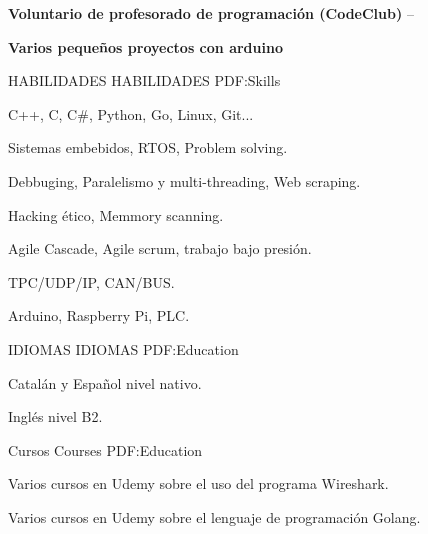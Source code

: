 \documentclass[letterpaper,MMMyyyy,nonstopmode]{simpleresumecv}
\begin{document}
\begin{Body}
\Gap

{\textbf{Voluntario de profesorado de programación (CodeClub)}}
\hfill
{} --

\Gap

{\textbf{Varios pequeños proyectos con arduino}}


\hfill


\Gap
\Gap


\Section
{HABILIDADES}
{HABILIDADES}
{PDF:Skills}

\Entry

C++, C, C\#, Python, Go, Linux, Git...

\Gap

Sistemas embebidos, RTOS, Problem solving.

\Gap

Debbuging, Paralelismo y multi-threading, Web scraping.

\Gap

Hacking ético, Memmory scanning.

\Gap

Agile Cascade, Agile scrum, trabajo bajo presión.

TPC/UDP/IP, CAN/BUS.

\Gap

Arduino, Raspberry Pi, PLC.

\Gap


\Gap
\Gap
\hfill



\Section
{IDIOMAS}
{IDIOMAS}
{PDF:Education}
\Entry

Catalán y Español nivel nativo.

\Gap

Inglés nivel B2.

\hfill

\Gap



\Section
{Cursos}
{Courses}
{PDF:Education}
\Entry

Varios cursos en Udemy sobre el uso del programa Wireshark.

\Gap

Varios cursos en Udemy sobre el lenguaje de programación Golang.


\end{Body}
\end{document}
